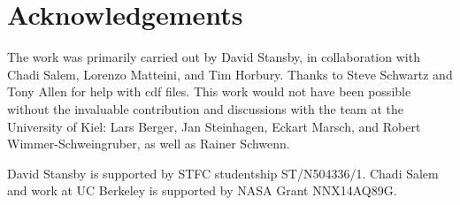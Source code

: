 \documentclass[11pt,a4paper]{article}
\begin{document}
\section{Acknowledgements}
The work was primarily carried out by David Stansby, in collaboration with Chadi Salem, Lorenzo Matteini, and Tim Horbury. Thanks to Steve Schwartz and Tony Allen for help with cdf files. This work would not have been possible without the invaluable contribution and discussions with the team at the University of Kiel: Lars Berger, Jan Steinhagen, Eckart Marsch, and Robert Wimmer-Schweingruber, as well as Rainer Schwenn.

David Stansby is supported by STFC studentship ST/N504336/1. Chadi Salem and work at UC Berkeley is supported by NASA Grant NNX14AQ89G. 
\end{document}
